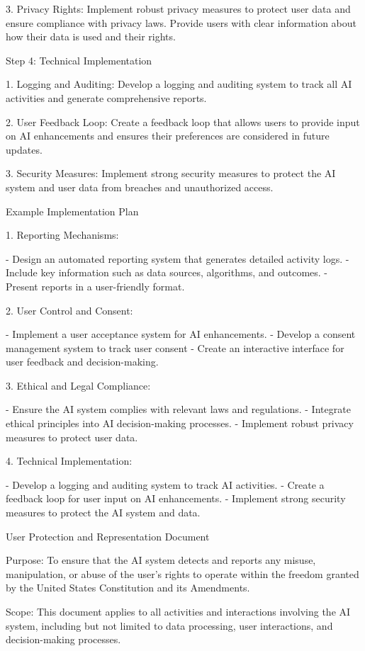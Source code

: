 \documentclass[12pt,letterpaper]{article}
\begin{document}
3. Privacy Rights: Implement robust privacy measures to protect user data and ensure compliance with privacy laws. Provide users with clear information about how their data is used and their rights.

 

Step 4: Technical Implementation

1. Logging and Auditing: Develop a logging and auditing system to track all AI activities and generate comprehensive reports.

2. User Feedback Loop: Create a feedback loop that allows users to provide input on AI enhancements and ensures their preferences are considered in future updates.

3. Security Measures: Implement strong security measures to protect the AI system and user data from breaches and unauthorized access.

 Example Implementation Plan

1. Reporting Mechanisms:

- Design an automated reporting system that generates detailed activity logs.
- Include key information such as data sources, algorithms, and outcomes.
- Present reports in a user-friendly format.

2. User Control and Consent:

- Implement a user acceptance system for AI enhancements.
- Develop a consent management system to track user consent
- Create an interactive interface for user feedback and decision-making.

3. Ethical and Legal Compliance:

- Ensure the AI system complies with relevant laws and regulations.
- Integrate ethical principles into AI decision-making processes.
- Implement robust privacy measures to protect user data.

4. Technical Implementation:

- Develop a logging and auditing system to track AI activities.
- Create a feedback loop for user input on AI enhancements.
- Implement strong security measures to protect the AI system and data.



User Protection and Representation Document

Purpose: To ensure that the AI system detects and reports any misuse, manipulation, or abuse of the user's rights to operate within the freedom granted by the United States Constitution and its Amendments.

Scope: This document applies to all activities and interactions involving the AI system, including but not limited to data processing, user interactions, and decision-making processes.
\end{document}
